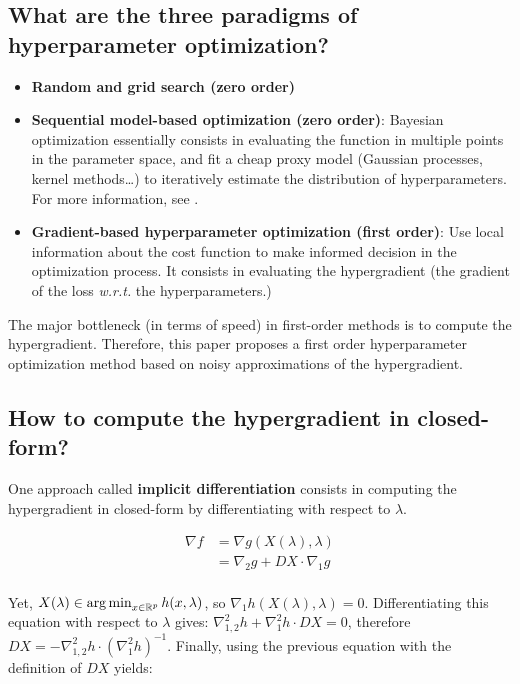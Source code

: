 \documentclass[a4paper,10pt]{article}
\theoremstyle{definition}
\begin{document}
\subsection*{What are the three paradigms of hyperparameter optimization?}

\begin{itemize}
    \item \textbf{Random and grid search (zero order)}
    \item \textbf{Sequential model-based optimization (zero order)}: Bayesian optimization essentially consists in evaluating the function in multiple points in the parameter space, and fit a cheap proxy model
                  (Gaussian processes, kernel methods\dots) to iteratively estimate the distribution of hyperparameters. For more information, see \cite{Brochu_Cora_deFreitas10}.
    \item \textbf{Gradient-based hyperparameter optimization (first order)}: Use local information about the cost function to make informed decision
                  in the optimization process. It consists in evaluating the hypergradient (the gradient of the loss \textit{w.r.t.} the hyperparameters.)
\end{itemize}

The major bottleneck (in terms of speed) in first-order methods is to compute the hypergradient.
Therefore, this paper proposes a first order hyperparameter optimization method based on noisy approximations of the hypergradient.

\subsection*{How to compute the hypergradient in closed-form?}

One approach called \textbf{implicit differentiation} consists in computing the hypergradient in closed-form by differentiating with respect to $\lambda$.

\begin{align*}
    \nabla f &= \nabla g(X(\lambda), \lambda) \\
             &= \nabla_2 g + DX \cdot \nabla_1 g
\end{align*}
\\
Yet, $X(\lambda) \in \operatorname*{arg\,min}_{x \in \mathbb{R}^p} h(x, \lambda)$, so $\nabla_1 h(X(\lambda), \lambda)=0$. Differentiating this equation with respect to $\lambda$
gives: $\nabla_{1, 2}^2 h + \nabla^2_1 h \cdot DX = 0$, therefore $DX = - \nabla^2_{1,2}h \cdot (\nabla_1^2 h)^{-1}$.  Finally, using the previous equation with
the definition of $DX$ yields:
\end{document}
